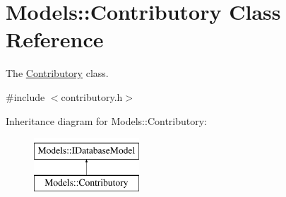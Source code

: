 \hypertarget{classModels_1_1Contributory}{\section{Models\+:\+:Contributory Class Reference}
\label{classModels_1_1Contributory}
}


The \hyperlink{classModels_1_1Contributory}{Contributory} class.  




{\ttfamily \#include $<$contributory.\+h$>$}

Inheritance diagram for Models\+:\+:Contributory\+:\begin{figure}[H]
\begin{center}
\leavevmode
\includegraphics[height=2.000000cm]{d5/dd1/classModels_1_1Contributory}
\end{center}
\end{figure}
